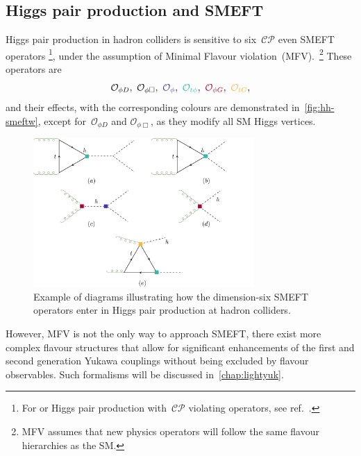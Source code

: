 \subsection{Higgs pair production and SMEFT}
\par Higgs pair production in hadron colliders is sensitive to six~$\mathcal{CP}$ even SMEFT operators \footnote{For or Higgs pair production with~$\mathcal{CP}$ violating operators, see ref.~\cite{Grober:2017gut}. }, under the assumption of Minimal Flavour violation~(MFV).~\footnote{MFV assumes that new physics operators will follow the same flavour hierarchies as the SM.} These operators are
\begin{equation}
	\mathcal{O}_{\phi D},\ \mathcal{O}_{\phi \Box},\ \textcolor[HTML]{4334a0}{\mathcal{O}_{\phi}}, \ 	\textcolor[HTML]{2ebbaa}{\mathcal{O}_{t\phi}}, \ 	\textcolor[HTML]{ae0034}{\mathcal{O}_{\phi G}},\ \textcolor[HTML]{ffb743}{\mathcal{O}_{t G}},
	\label{HH-smeft}
\end{equation}
and their effects, with the corresponding colours are demonstrated in~\autoref{fig:hh-smeftw}, except for~$\mathcal{O}_{\phi D}$ and  $\mathcal{O}_{\phi \Box}$, as they modify all SM Higgs vertices. 
\begin{figure}[t!]
	\begin{center}
		\includegraphics[width=0.75\textwidth]{figures/hh-smeft}
		\caption{ Example of diagrams illustrating how the dimension-six SMEFT operators enter in Higgs pair production at hadron colliders. \label{fig:hh-smeftw} }
	\end{center}
\end{figure}
However, MFV is not the only way to approach SMEFT, there exist more complex flavour structures that allow for significant enhancements of the first and second generation Yukawa couplings without being excluded by flavour observables. Such formalisms will be discussed in~\autoref{chap:lightyuk}.
